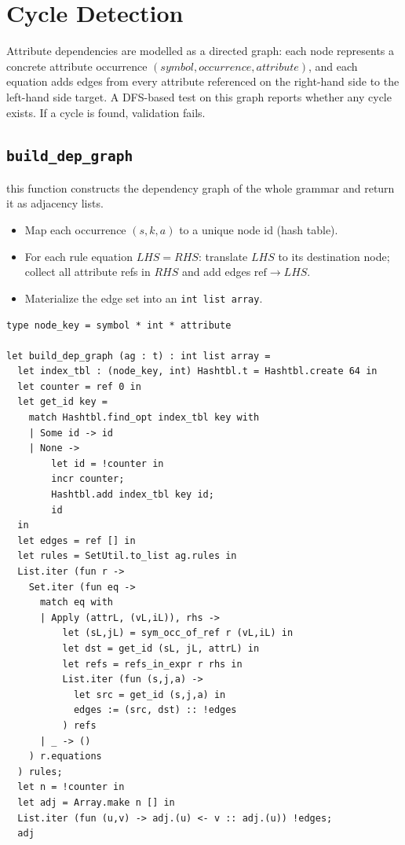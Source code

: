 \section{Cycle Detection}
Attribute dependencies are modelled as a directed graph: each node represents a concrete attribute occurrence 
\((\textit{symbol}, \textit{occurrence}, \textit{attribute})\), and each equation adds edges from every attribute referenced on the right-hand 
side to the left-hand side target. A DFS-based test on this graph reports whether any cycle exists. If a cycle is found, validation fails. 

\subsection{\texttt{build\_dep\_graph}}
this function constructs the dependency graph of the whole grammar and return it as adjacency lists. 

\begin{itemize}
  \item Map each occurrence \((s, k, a)\) to a unique node id (hash table). 
  \item For each rule equation \(LHS = RHS\): translate \(LHS\) to its destination node; collect all attribute refs in \(RHS\) and add edges \(\text{ref} \to LHS\). 
  \item Materialize the edge set into an \texttt{int list array}. 
\end{itemize}

\begin{verbatim}
type node_key = symbol * int * attribute

let build_dep_graph (ag : t) : int list array =
  let index_tbl : (node_key, int) Hashtbl.t = Hashtbl.create 64 in
  let counter = ref 0 in
  let get_id key =
    match Hashtbl.find_opt index_tbl key with
    | Some id -> id
    | None ->
        let id = !counter in
        incr counter;
        Hashtbl.add index_tbl key id;
        id
  in
  let edges = ref [] in
  let rules = SetUtil.to_list ag.rules in
  List.iter (fun r ->
    Set.iter (fun eq ->
      match eq with
      | Apply (attrL, (vL,iL)), rhs ->
          let (sL,jL) = sym_occ_of_ref r (vL,iL) in
          let dst = get_id (sL, jL, attrL) in
          let refs = refs_in_expr r rhs in
          List.iter (fun (s,j,a) ->
            let src = get_id (s,j,a) in
            edges := (src, dst) :: !edges
          ) refs
      | _ -> ()
    ) r.equations
  ) rules;
  let n = !counter in
  let adj = Array.make n [] in
  List.iter (fun (u,v) -> adj.(u) <- v :: adj.(u)) !edges;
  adj
\end{verbatim}

